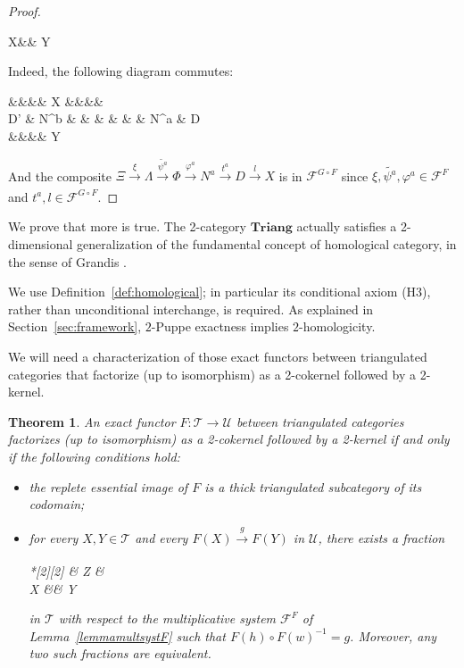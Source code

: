 \documentclass[11pt,reqno,a4paper]{amsart}
\newtheorem{theorem}{Theorem}[section]
\theoremstyle{definition}
\theoremstyle{remark}
\def\nameit#1{\textrm{#1}~}
\def\lemx{\nameit{Lemma}}
\newcommand{\T}{\mathcal{T}}
\newcommand{\U}{\mathcal{U}}
\newcommand{\F}{\mathcal{F}}
\newcommand{\0}{\mathbf{0}}
\renewcommand{\1}{\mathbf{1}}
\newcommand{\Triang}{\mathbf{Triang}}
\def\:{\colon}
\def\c{\circ}
\def\phi{\varphi}
\newcommand{\aar}[2][]{\xrightarrow[#1]{#2}}
\begin{document}
\begin{proof}
\begin{cd}
	X\&\& Y
	\arrow["l'"', from=1-2, to=2-1]
	\arrow["r'", from=1-2, to=2-3]\end{cd}
    Indeed, the following diagram commutes:
    \begin{cd}[4]
        \&\&\&\& X \&\&\&\& \\
	{D'} \& {N^b} \& \Phi \& \Lambda \& \Xi \& \Lambda \& \Phi \& {N^a} \& D \\
	\&\&\&\& Y
	\arrow["{l'}",,bend left=10, from=2-1, to=1-5]
	\arrow["{r'}"',bend right=10, from=2-1, to=3-5]
	\arrow["{t^b}"', from=2-2, to=2-1]
	\arrow["{\phi^b}"', from=2-3, to=2-2]
	\arrow["{\widetilde{\psi^a}}"', from=2-4, to=2-3]
	\arrow["\xi"', from=2-5, to=2-4]
	\arrow["\xi", from=2-5, to=2-6]
	\arrow["{\widetilde{\psi^a}}", from=2-6, to=2-7]
	\arrow["{\phi^a}", from=2-7, to=2-8]
	\arrow["{t^a}", from=2-8, to=2-9]
	\arrow["l"',bend right=10, from=2-9, to=1-5]
	\arrow["r",bend left=10, from=2-9, to=3-5]
    \end{cd}
    And the composite $\Xi\aar{\xi}\Lambda\aar{\widetilde{\psi^a}}\Phi\aar{\phi^a}N^a\aar{t^a}D\aar{l}X$ is in $\F^{G\c F}$ since $\xi,\widetilde{\psi^a},\phi^a\in \F^F$ and $t^a,l\in \F^{G\c F}$.
\end{proof}

We prove that more is true. The 2-category $\Triang$ actually satisfies a 2-dimensional generalization of the fundamental concept of homological category, in the sense of Grandis \cite{Grandis13}.

We use Definition~\ref{def:homological}; in particular its conditional axiom \textup{(H3)}, rather than unconditional interchange, is required. As explained in Section~\ref{sec:framework}, $2$-Puppe exactness implies $2$-homologicity.

We will need a characterization of those exact functors between triangulated categories that factorize (up to isomorphism) as a 2-cokernel followed by a 2-kernel.

\begin{theorem}\label{theorcharactVerdierfunctors}
   An exact functor $F\:\T \to \U$ between triangulated categories factorizes (up to isomorphism) as a 2-cokernel followed by a 2-kernel if and only if the following conditions hold:
\begin{itemize}
\item [(C1)] the replete essential image of $F$ is a thick triangulated subcategory of its codomain;
\item [(C2)] for every $X,Y\in \T$ and every $F(X) \aar{g} F(Y)$ in $\U$, there exists a fraction \begin{cd}*[2][2] \& Z \& \\[-2ex]
	X \&\& Y
	\arrow["w"', from=1-2, to=2-1]
	\arrow["h", from=1-2, to=2-3]\end{cd} in $\T$ with respect to the multiplicative system $\mathcal{F}^F$ of \lemx\ref{lemmamultsystF} such that $F(h) \circ F(w)^{-1}=g$. Moreover, any two such fractions are equivalent.
\end{itemize}
\end{theorem}
\end{document}
